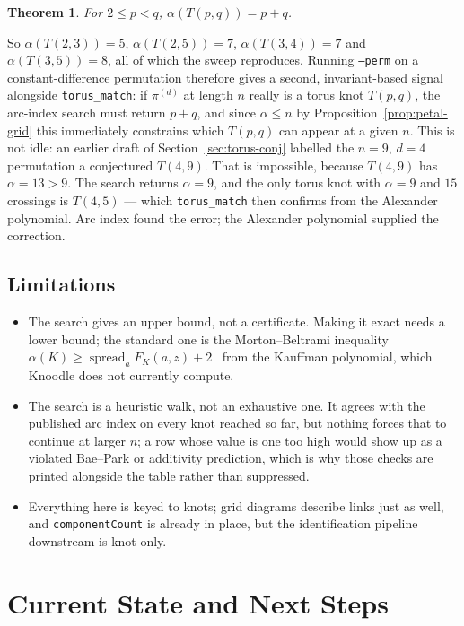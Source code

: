 \documentclass[11pt,oneside]{report}
\newtheorem{theorem}{Theorem}[chapter]
\theoremstyle{definition}
\begin{document}
\begin{theorem}
For $2 \leq p < q$, $\alpha(T(p,q)) = p + q$.
\end{theorem}

So $\alpha(T(2,3)) = 5$, $\alpha(T(2,5)) = 7$, $\alpha(T(3,4)) = 7$ and
$\alpha(T(3,5)) = 8$, all of which the sweep reproduces. Running
\texttt{--perm} on a constant-difference permutation therefore gives a
second, invariant-based signal alongside \texttt{torus\_match}: if
$\pi^{(d)}$ at length $n$ really is a torus knot $T(p,q)$, the arc-index
search must return $p + q$, and since $\alpha \leq n$ by
Proposition~\ref{prop:petal-grid} this immediately constrains which
$T(p,q)$ can appear at a given $n$. This is not idle: an earlier draft of
Section~\ref{sec:torus-conj} labelled the $n = 9$, $d = 4$ permutation a
conjectured $T(4,9)$. That is impossible, because $T(4,9)$ has
$\alpha = 13 > 9$. The search returns $\alpha = 9$, and the only torus
knot with $\alpha = 9$ and $15$ crossings is $T(4,5)$ --- which
\texttt{torus\_match} then confirms from the Alexander polynomial. Arc
index found the error; the Alexander polynomial supplied the correction.

\section{Limitations}

\begin{itemize}[leftmargin=2em]
\item The search gives an upper bound, not a certificate. Making it exact
needs a lower bound; the standard one is the Morton--Beltrami inequality
$\alpha(K) \geq \operatorname{spread}_a F_K(a,z) + 2$~\cite{MortonBeltrami} from the Kauffman
polynomial, which Knoodle does not currently compute.
\item The search is a heuristic walk, not an exhaustive one. It agrees with
the published arc index on every knot reached so far, but nothing forces
that to continue at larger $n$; a row whose value is one too high would
show up as a violated Bae--Park or additivity prediction, which is why
those checks are printed alongside the table rather than suppressed.
\item Everything here is keyed to knots; grid diagrams describe links just
as well, and \texttt{componentCount} is already in place, but the
identification pipeline downstream is knot-only.
\end{itemize}

\chapter{Current State and Next Steps}\label{chap:state}
\end{document}
